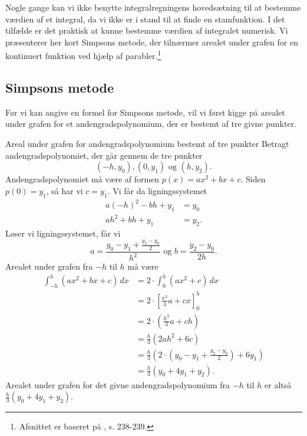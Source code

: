 Nogle gange kan vi ikke benytte integralregningens hovedsætning til at bestemme værdien af et integral, da vi ikke er i stand til at finde en stamfunktion.
I det tilfælde er det praktisk at kunne bestemme værdien af integralet numerisk.
Vi præsenterer her kort Simpsons metode, der tilnærmer arealet under grafen for en kontinuert funktion ved hjælp af parabler.\footnote{Afsnittet er baseret på \cite{Bartle2010}, s. 238-239.}

\subsection{Simpsons metode}%
\label{sub:Simpsons metode}

Før vi kan angive en formel for Simpsons metode, vil vi først kigge på arealet under grafen for et andengradspolynomium, der er bestemt af tre givne punkter.

\begin{example}[label=exa:andengrad]{Areal under grafen for andengradspolynomium bestemt af tre punkter}{}
  Betragt andengradspolynomiet, der går gennem de tre punkter
  \[
  (-h, y_0), (0, y_1) \text{ og } (h, y_2).
  \] 
  Andengradspolynomiet må være af formen $p(x)=ax^2+bx+c$.
  Siden $p(0)=y_1$, så har vi $c=y_1$.
Vi får da ligningssystemet
\begin{equation*}
\begin{split}
  a (-h)^2 -bh + y_1&=y_0 \\
  a h^2 + bh + y_1&=y_2.
\end{split}
\end{equation*}
  Løser vi ligningssystemet, får vi 
  \[
  a=\frac{y_0-y_1+\frac{y_2-y_0}{2}}{h^2} \text{ og }b=\frac{y_2-y_0}{2h}. 
  \] 
  Arealet under grafen fra $-h$ til $h$ må være
  \begin{equation*}
  \begin{split}
    \int_{-h}^{h} (ax^2+bx+c) \,dx &= 2 \cdot \int_{0}^{h} \left(ax^2+c\right)  \,dx \\
    &=2 \cdot \left[\frac{x^3}{3} a + cx\right]_0^h \\
    &=2 \cdot \left(\frac{h^3}{3}a + ch\right) \\
    &=\frac{h}{3}\left(2ah^2+6c\right) \\
    &=\frac{h}{3} \left(2 \cdot \left(y_0-y_1 + \frac{y_2-y_0}{2}\right) + 6y_1\right) \\
    &=\frac{h}{3} \left(y_0+4y_1+y_2\right).
  \end{split}
  \end{equation*}
 Arealet under grafen for det givne andengradspolynomium fra $-h$ til $h$ er altså $\frac{h}{3} \left(y_0 + 4y_1 + y_2\right) $.
\end{example}

